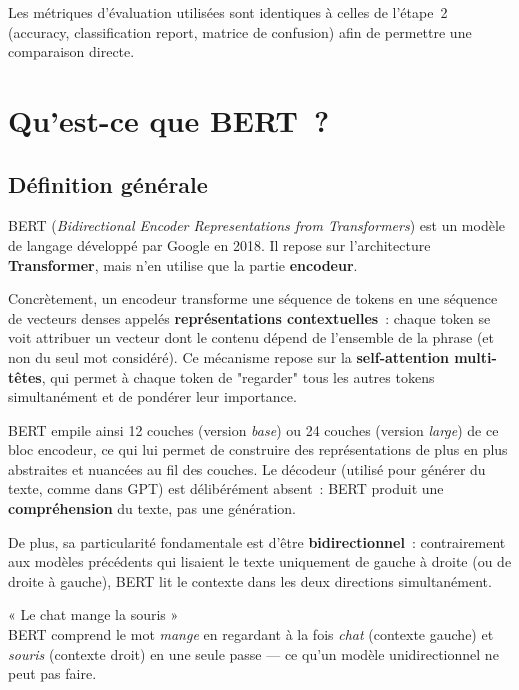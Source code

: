 \documentclass[12pt,a4paper]{article}
\begin{document}
\begin{note}[Remarque]
Les métriques d'évaluation utilisées sont identiques à celles de l'étape~2 (accuracy,
classification report, matrice de confusion) afin de permettre une comparaison directe.
\end{note}

\pagebreak
\section{Qu'est-ce que BERT~?}

\subsection{Définition générale}

BERT (\textit{Bidirectional Encoder Representations from Transformers}) est un modèle
de langage développé par Google en 2018. Il repose sur
l'architecture \textbf{Transformer}, mais n'en utilise que la partie \textbf{encodeur}.

Concrètement, un encodeur transforme une séquence de tokens en une
séquence de vecteurs denses appelés \textbf{représentations contextuelles}~: chaque token
se voit attribuer un vecteur dont le contenu dépend de l'ensemble de la phrase (et non du
seul mot considéré). Ce mécanisme repose sur la \textbf{self-attention multi-têtes}, qui
permet à chaque token de "regarder" tous les autres tokens simultanément et de pondérer
leur importance. 

BERT empile ainsi 12 couches (version \textit{base}) ou 24 couches
(version \textit{large}) de ce bloc encodeur, ce qui lui permet de construire des
représentations de plus en plus abstraites et nuancées au fil des couches. Le décodeur
(utilisé pour générer du texte, comme dans GPT) est délibérément absent~: BERT produit
une \textbf{compréhension} du texte, pas une génération.

De plus, sa particularité fondamentale est d'être \textbf{bidirectionnel}~: contrairement aux
modèles précédents qui lisaient le texte uniquement de gauche à droite (ou de droite à
gauche), BERT lit le contexte dans les deux directions simultanément.

\vspace{10mm}

\begin{note}
« Le chat mange la souris »\\[4pt]
BERT comprend le mot \textit{mange} en regardant à la fois \textit{chat} (contexte gauche)
et \textit{souris} (contexte droit) en une seule passe — ce qu'un modèle unidirectionnel
ne peut pas faire.
\end{note}
\end{document}
